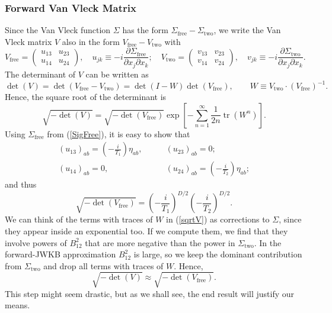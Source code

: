 \subsubsection{Forward Van Vleck Matrix}
Since the Van Vleck function $\Sigma$ has the form $\Sigma_{\text{free}} - \Sigma_{\text{two}}$, we write the Van Vleck matrix $V$ also in the form $V_{\text{free}} - V_{\text{two}}$ with
\begin{equation}
	V_{\text{free}} = \begin{pmatrix}
	u_{1 3} & u_{2 3} \\
	u_{1 4} & u_{2 4}
	\end{pmatrix}, \quad u_{jk} \equiv - i \frac{\partial \Sigma_{\text{free}}}{\partial x_{j} \partial x_{k}}; \quad V_{\text{two}} = \begin{pmatrix}
	v_{1 3} & v_{2 3} \\
	v_{1 4} & v_{2 4}
	\end{pmatrix}, \quad v_{jk} \equiv - i \frac{\partial \Sigma_{\text{two}}}{\partial x_{j} \partial x_{k}}.
\end{equation}
The determinant of $V$ can be written as
\begin{equation}
	\det{(V)} = \det(V_{\text{free}} - V_{\text{two}}) = \det{(I - W)} \det{(V_{\text{free}})}, \qquad W \equiv V_{\text{two}} \cdot (V_{\text{free}})^{-1}.
\end{equation}
Hence, the square root of the determinant is
\begin{equation}
	\sqrt{-\det{(V)}} = \sqrt{-\det{(V_{\text{free}})}} \exp{\left[ - \sum_{n = 1}^{\infty} \frac{1}{2 n} \operatorname{tr}{(W^{n})} \right]}.
	\label{sqrtV}
\end{equation}
Using $\Sigma_{\text{free}}$ from (\ref{SigFree}), it is easy to show that
\begin{equation}
\begin{split}
	(u_{13})_{ab} = \left( - \frac{i}{T_{1}} \right) \eta_{ab}, &\qquad (u_{23})_{ab} = 0; \\
	(u_{14})_{ab} = 0, &\qquad (u_{24})_{ab} = \left( - \frac{i}{T_{2}} \right) \eta_{ab};
\end{split}
\end{equation}
and thus
\begin{equation}
	\sqrt{-\det{(V_{\text{free}})}} = \left( - \frac{i}{T_{1}} \right)^{D/2} \left( - \frac{i}{T_{2}} \right)^{D/2}.
\end{equation}
We can think of the terms with traces of $W$ in (\ref{sqrtV}) as corrections to $\Sigma$, since they appear inside an exponential too. If we compute them, we find that they involve powers of $B_{12}^{2}$ that are more negative than the power in $\Sigma_{\text{two}}$. In the forward-JWKB approximation $B_{1 2}^{2}$ is large, so we keep the dominant contribution from $\Sigma_{\text{two}}$ and drop all terms with traces of $W$. Hence,
\begin{equation}
	\sqrt{-\det{(V)}} \approx \sqrt{-\det{(V_{\text{free}})}}.
\end{equation}
This step might seem drastic, but as we shall see, the end result will justify our means.
